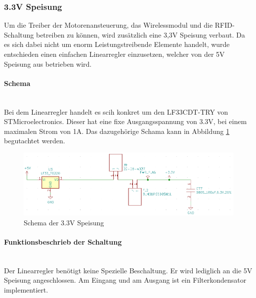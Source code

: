 \subsubsection{3.3V Speisung}
\label{subsubsec:3.3V Speisung}

Um die Treiber der Motorenansteuerung, das Wirelessmodul und die RFID-Schaltung betreiben zu können, wird zusätzlich eine 3,3V Speisung verbaut. Da es sich dabei nicht um enorm Leistungstreibende Elemente handelt, wurde entschieden einen einfachen Linearregler einzusetzen, welcher von der 5V Speisung aus betrieben wird. 

\paragraph{Schema}\mbox{}\\

Bei dem Linearregler handelt es scih konkret um den LF33CDT-TRY von STMicroelectronics. Dieser hat eine fixe Ausgangsspannung von 3.3V, bei einem maximalen Strom von 1A. Das dazugehörige Schama kann in Abbildung \ref{fig:Schema_Speisung_3.3V} begutachtet werden.

\begin{figure}[h!]
	\centering
	\includegraphics[width=\textwidth]{graphics/Schema_Speisung_3,3V.png}
	\caption{Schema der 3.3V Speisung}
	\label{fig:Schema_Speisung_3.3V}
\end{figure} 


\paragraph{Funktionsbeschrieb der Schaltung}\mbox{}\\

Der Linearregler benötigt keine Spezielle Beschaltung. Er wird lediglich an die 5V Speisung angeschlossen. Am Eingang und am Ausgang ist ein Filterkondensator implementiert. 
